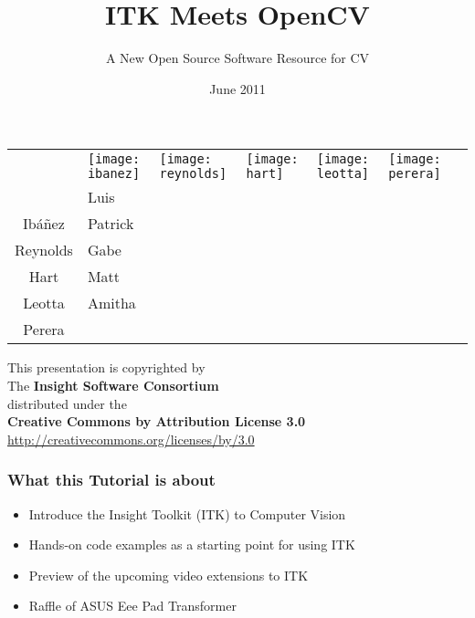 \documentclass[18pt]{beamer}
\begin{document}
\title[ITK - OpenCV]{ITK Meets OpenCV}
\subtitle[ITK-OpenCV]{A New Open Source Software Resource for CV}
\date[June 2011]{June 2011}

\begin{frame}
\titlepage
\begin{tabular}{cp{}p{}p{}p{}p{}c}
&
\centering\texttt{[image: ibanez]} &
\centering\texttt{[image: reynolds]} &
\centering\texttt{[image: hart]} &
\centering\texttt{[image: leotta]} &
\centering\texttt{[image: perera]} & \\
&
\centering{}Luis \\Ib\'a\~nez &
\centering{}Patrick \\Reynolds &
\centering{}Gabe \\Hart &
\centering{}Matt \\Leotta &
\centering{}Amitha \\Perera & \\
\end{tabular}
\end{frame}


{
\begin{frame}[plain]
\center
\begin{center}
This presentation is copyrighted by\\
The \textbf{Insight Software Consortium}\\
\bigskip
distributed under the\\
\textbf{Creative Commons by Attribution License 3.0}\\
\url{http://creativecommons.org/licenses/by/3.0}\\
\end{center}
\end{frame}
}




\begin{frame}
\frametitle{What this Tutorial is about}
\begin{itemize}
\item Introduce the Insight Toolkit (ITK) to Computer Vision
\item Hands-on code examples as a starting point for using ITK
\item Preview of the upcoming video extensions to ITK
\item Raffle of ASUS Eee Pad Transformer
\end{itemize}
\end{frame}
\end{document}
